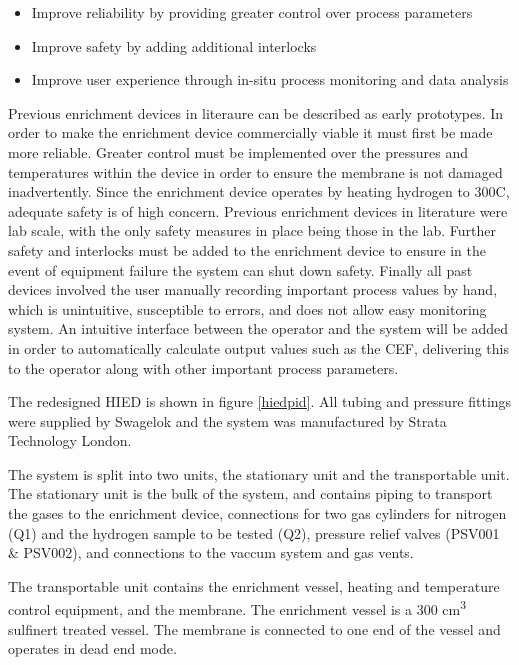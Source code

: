 \begin{itemize}
    \item Improve reliability by providing greater control over process parameters
    \item Improve safety by adding additional interlocks
    \item Improve user experience through in-situ process monitoring and data analysis
\end{itemize}

Previous enrichment devices in literaure can be described as early prototypes.\cite{Ahmed2010} \cite{Murugan2014} In order to make the enrichment device commercially viable it must first be made more reliable. Greater control must be implemented over the pressures and temperatures within the device in order to ensure the membrane is not damaged inadvertently. Since the enrichment device operates by heating hydrogen to 300\textdegree C, adequate safety is of high concern. Previous enrichment devices in literature were lab scale, with the only safety measures in place being those in the lab. Further safety and interlocks must be added to the enrichment device to ensure in the event of equipment failure the system can shut down safety. Finally all past devices involved the user manually recording important process values by hand, which is unintuitive, susceptible to errors, and does not allow easy monitoring system. An intuitive interface between the operator and the system will be added in order to automatically calculate output values such as the CEF, delivering this to the operator along with other important process parameters. 

The redesigned HIED is shown in figure \ref{hiedpid}. All tubing and pressure fittings were supplied by Swagelok \cite{swagelok} and the system was manufactured by Strata Technology London. \cite{stratatechnology}

The system is split into two units, the stationary unit and the transportable unit. The stationary unit is the bulk of the system, and contains piping to transport the gases to the enrichment device, connections for two gas cylinders for nitrogen (Q1) and the hydrogen sample to be tested (Q2), pressure relief valves (PSV001 \& PSV002), and connections to the vaccum system and gas vents. 

The transportable unit contains the enrichment vessel, heating and temperature control equipment, and the membrane. The enrichment vessel is a 300 cm\textsuperscript{3} sulfinert \cite{sulfinerttreatedsamplecylinder} treated vessel. The membrane is connected to one end of the vessel and operates in dead end mode. 

